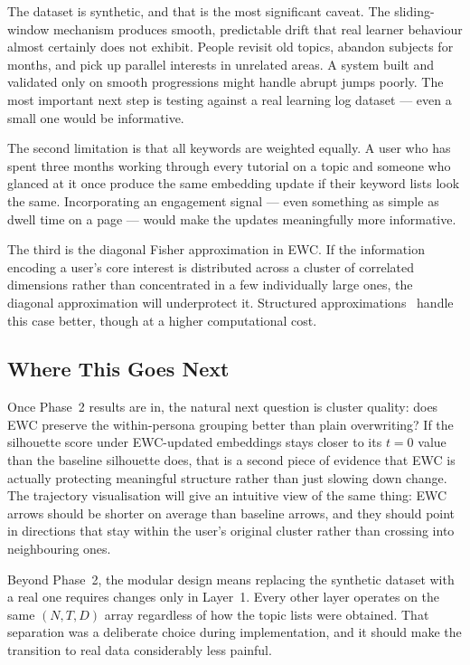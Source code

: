 \documentclass[conference]{IEEEtran}
\begin{document}
The dataset is synthetic, and that is the most significant
caveat. The sliding-window mechanism produces smooth,
predictable drift that real learner behaviour almost
certainly does not exhibit. People revisit old topics,
abandon subjects for months, and pick up parallel interests
in unrelated areas. A system built and validated only on
smooth progressions might handle abrupt jumps poorly. The
most important next step is testing against a real learning
log dataset --- even a small one would be informative.

The second limitation is that all keywords are weighted
equally. A user who has spent three months working through
every tutorial on a topic and someone who glanced at it once
produce the same embedding update if their keyword lists look
the same. Incorporating an engagement signal --- even
something as simple as dwell time on a page --- would make
the updates meaningfully more informative.

The third is the diagonal Fisher approximation in EWC. If the
information encoding a user's core interest is distributed
across a cluster of correlated dimensions rather than
concentrated in a few individually large ones, the diagonal
approximation will underprotect it. Structured
approximations~\cite{ritter2018} handle this case better,
though at a higher computational cost.

\subsection{Where This Goes Next}

Once Phase~2 results are in, the natural next question is
cluster quality: does EWC preserve the within-persona
grouping better than plain overwriting? If the silhouette
score under EWC-updated embeddings stays closer to its
$t{=}0$ value than the baseline silhouette does, that is a
second piece of evidence that EWC is actually protecting
meaningful structure rather than just slowing down change.
The trajectory visualisation will give an intuitive view of
the same thing: EWC arrows should be shorter on average than
baseline arrows, and they should point in directions that
stay within the user's original cluster rather than crossing
into neighbouring ones.

Beyond Phase~2, the modular design means replacing the
synthetic dataset with a real one requires changes only in
Layer~1. Every other layer operates on the same $(N, T, D)$
array regardless of how the topic lists were obtained. That
separation was a deliberate choice during implementation, and
it should make the transition to real data considerably less
painful.
\end{document}
